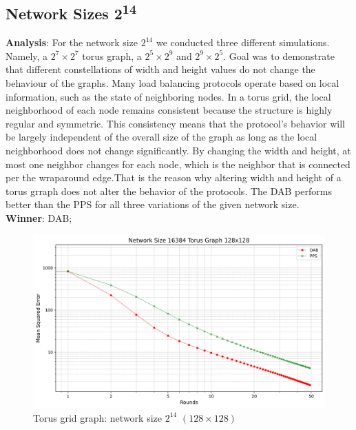 \subsection{Network Sizes 2\textsuperscript{14}}
\textbf{Analysis}: For the network size $2^{14}$ we conducted three different simulations. Namely, a $2^{7} \times 2^{7}$ torus graph, a $2^{5} \times 2^{9}$ and $2^{9} \times 2^{5}$. Goal was to demonstrate that different constellations of width and height values do not change the behaviour of the graphs. Many load balancing protocols operate based on local information, such as the state of neighboring nodes. In a torus grid, the local neighborhood of each node remains consistent because the structure is highly regular and symmetric. This consistency means that the protocol's behavior will be largely independent of the overall size of the graph as long as the local neighborhood does not change significantly. By changing the width and height, at most one neighbor changes for each node, which is the neighbor that is connected per the wraparound edge.That is the reason why altering width and height of a torus grraph does not alter the behavior of the protocols. The DAB performs better than the PPS for all three variations of the given network size. \\
\textbf{Winner}: DAB;
\begin{figure}[H]
    \centering
    \includegraphics[scale=0.5]{figures/torusGridGraphSimulations/128x128/DAB_vs_PPS_TG_r50_n16384.png}
    \caption{Torus grid graph: network size $2^{14}$ $(128\times128)$}
    \label{fig:16384torusGraph}
\end{figure}

